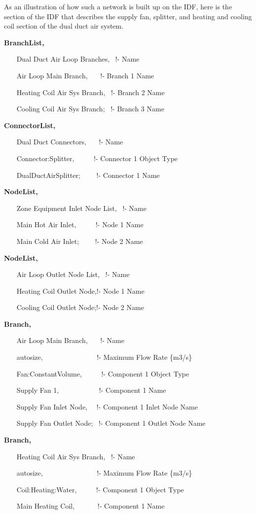 As an illustration of how such a network is built up on the IDF, here is the section of the IDF that describes the supply fan, splitter, and heating and cooling coil section of the dual duct air system.

\textbf{BranchList,}

~~~ Dual Duct Air Loop Branches,~ !- Name

~~~ Air Loop Main Branch,~~~ !- Branch 1 Name

~~~ Heating Coil Air Sys Branch,~ !- Branch 2 Name

~~~ Cooling Coil Air Sys Branch;~ !- Branch 3 Name

\textbf{ConnectorList,}

~~~ Dual Duct Connectors,~~~ !- Name

~~~ Connector:Splitter,~~~~~ !- Connector 1 Object Type

~~~ DualDuctAirSplitter;~~~~ !- Connector 1 Name

\textbf{NodeList,}

~~~ Zone Equipment Inlet Node List,~ !- Name

~~~ Main Hot Air Inlet,~~~~~ !- Node 1 Name

~~~ Main Cold Air Inlet;~~~~ !- Node 2 Name

\textbf{NodeList,}

~~~ Air Loop Outlet Node List,~ !- Name

~~~ Heating Coil Outlet Node,!- Node 1 Name

~~~ Cooling Coil Outlet Node;!- Node 2 Name

\textbf{Branch,}

~~~ Air Loop Main Branch,~~~ !- Name

~~~ autosize,~~~~~~~~~~~~~~~ !- Maximum Flow Rate \{m3/s\}

~~~ Fan:ConstantVolume,~~~~~ !- Component 1 Object Type

~~~ Supply Fan 1,~~~~~~~~~~~ !- Component 1 Name

~~~ Supply Fan Inlet Node,~~ !- Component 1 Inlet Node Name

~~~ Supply Fan Outlet Node;~ !- Component 1 Outlet Node Name


\textbf{Branch,}

~~~ Heating Coil Air Sys Branch,~ !- Name

~~~ autosize,~~~~~~~~~~~~~~~ !- Maximum Flow Rate \{m3/s\}

~~~ Coil:Heating:Water,~~~~~ !- Component 1 Object Type

~~~ Main Heating Coil,~~~~~~ !- Component 1 Name

